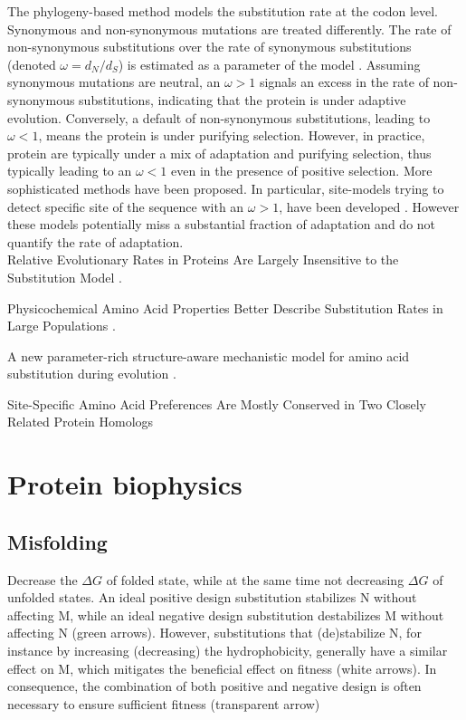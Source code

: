 The phylogeny-based method models the \gls{substitution} rate at the \gls{codon} level. Synonymous and non-synonymous mutations are treated differently. The rate of non-synonymous substitutions over the rate of synonymous substitutions (denoted $\omega=d_N/d_S$) is estimated as a parameter of the model \citep{Muse1994,Goldman1994}. Assuming synonymous mutations are \gls{neutral}, an $\omega>1$ signals an excess in the rate of non-synonymous substitutions, indicating that the protein is under adaptive evolution. Conversely, a default of non-synonymous substitutions, leading to $\omega<1$, means the protein is under purifying selection. However, in practice, protein are typically under a mix of adaptation and purifying selection, thus typically leading to an $\omega<1$ even in the presence of positive selection. More sophisticated methods have been proposed. In particular, site-models trying to detect specific site of the sequence with an $\omega>1$, have been developed \citep{Yang2001, kosiol_patterns_2008}.
However these models potentially miss a substantial fraction of adaptation and do not quantify the rate of adaptation.  \\



Relative Evolutionary Rates in Proteins Are Largely Insensitive to the Substitution Model \citep{Spielman2018}.

Physicochemical Amino Acid Properties Better Describe Substitution Rates in Large Populations \citep{Weber2019}.

A new parameter-rich structure-aware mechanistic model for amino acid \gls{substitution} during evolution \citep{Chi2018}.


Site-Specific Amino Acid Preferences Are Mostly Conserved in Two Closely Related Protein Homologs \citep{Doud2015}

\section{Protein biophysics}

\subsection{Misfolding}

Decrease the $\Delta G$ of folded state, while at the same time not decreasing $\Delta G$ of unfolded states.
An ideal positive design \gls{substitution} stabilizes N without affecting M, while an ideal negative design \gls{substitution} destabilizes M without affecting N (green arrows). However, substitutions that (de)stabilize N, for instance by increasing (decreasing) the hydrophobicity, generally have a similar effect on M, which mitigates the beneficial effect on fitness (white arrows). In consequence, the combination of both positive and negative design is often necessary to ensure sufficient fitness (transparent arrow)


